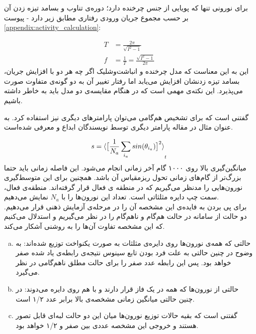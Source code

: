 برای نورونی تنها که پویایی از جنس چرخنده دارد؛ دوره‌ی تناوب و بسامد تیزه زدن آن بر حسب مجموع جریان ورودی‌ رفتاری مطابق زیر دارد - پیوست
\ref{appendix:activity_calculation}:

\begin{align}
	T &= \frac{2\pi}{\sqrt{I^2 - 1}}\\
	f &= \frac{1}{T} = \frac{\sqrt{I^2 - 1}}{2\pi}
\end{align}
این به این معناست که مدل چرخنده و انباشت‌وشلیک اگر چه هر دو با افزایش جریان، بسامد تیزه زدنشان افزایش می‌یابد اما رفتار تغییر آن به دو گونه‌ی متفاوت صورت می‌پذیرد. این نکته‌ی مهمی است که در هنگام مقایسه‌ی دو مدل باید به خاطر داشته باشیم.

گفتنی است که برای تشخیص هم‌گامی می‌توان پارامترهای دیگری نیز استفاده کرد. به عنوان مثال در مقاله
\cite{safaeesirat2020critical}
 پارامتر دیگری توسط نویسندگان ابداع و معرفی شده‌است.

\begin{equation}
	s =  \braket{ \big[ \frac{1}{N_a}\sum_{i_a} sin(\theta_{i_a}) \big]^{2}}_t
	\label{eq:saman_amin_param}
\end{equation}
میانگین‌گیری بالا روی ۱۰۰۰ گام آخر زمانی انجام می‌شود. این فاصله زمانی باید حتما بزرگ‌تر از گام‌های زمانی تحول ریزمقیاس آن باشد. همچنین برای این متوسط‌گیری نورون‌هایی را مدنظر می‌گیریم که در منطقه ی فعال قرار گرفته‌اند. منطقه‌ی فعال، سمت چپ دایره مثلثاتی است. تعداد این نورون‌ها را با $N_a$ نمایش می‌دهیم.\\
برای پی بردن به فایده‌ی این مشخصه آن را در مرحله‌ی آزمایش ذهنی قرار می‌دهیم. دو حالت از سامانه در حالت هم‌گام و نا‌هم‌گام را در نظر می‌گیریم و استدلال می‌کنیم که این مشخصه تفاوت آن‌ها را به روشنی آشکار می‌کند.\\

\begin{enumerate}[(a)]
	\item 
	حالتی که همه‌ی نورون‌ها روی دایره‌ی مثلثات به صورت یکنواخت توزیع شده‌اند: به وضوح در چنین حالتی به علت فرد بودن تابع سینوس نتیجه‌ی رابطه‌ی یاد شده صفر خواهد بود. پس این رابطه عدد صفر را برای حالت مطلق نا‌هم‌گامی در نظر می‌گیرد.
	\item 
	حالتی از نورون‌ها که همه در یک فاز قرار دارند و با هم روی دایره می‌دوند: در چنین حالتی میانگین زمانی مشخصه‌ی بالا برابر عدد ۱/۲ است.
	\item 
	گفتنی است که بقیه حالات توزیع نورون‌ها میان این دو حالت لبه‌ای قابل تصور هستند و خروجی این مشخصه عددی بین صفر و ۱/۲ خواهد بود.
\end{enumerate}

